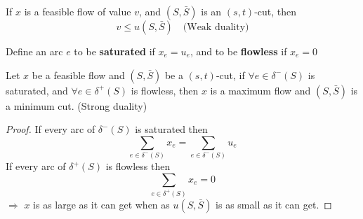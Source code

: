 
			\begin{corollary}
				If $x$ is a feasible flow of value $v$, and $(S, \bar{S})$ is an $(s, t)$-cut, then
				\begin{equation}
					v \le u(S, \bar{S}) \quad \text{(Weak duality)}
				\end{equation}
			\end{corollary}

			\begin{definition}
				Define an arc $e$ to be \textbf{saturated} if $x_e = u_e$, and to be \textbf{flowless} if $x_e = 0$
			\end{definition}

			\begin{corollary}
				Let $x$ be a feasible flow and $(S, \bar{S})$ be a $(s, t)$-cut, if $\forall e\in \delta^-(S)$ is saturated, and $\forall e\in \delta^+(S)$ is flowless, then $x$ is a maximum flow and $(S, \bar{S})$ is a minimum cut. (Strong duality)
			\end{corollary}

			\begin{proof}
				If every arc of $\delta^-(S)$ is saturated then
				\begin{equation}
					\sum_{e\in \delta^-(S)}x_e = \sum_{e\in \delta^-(S)}u_e
				\end{equation}
				If every arc of $\delta^+(S)$ is flowless then
				\begin{equation}
					\sum_{e\in \delta^+(S)}x_e = 0
				\end{equation}
				$\Rightarrow$ $x$ is as large as it can get when as $u(S, \bar{S})$ is as small as it can get.
			\end{proof}

